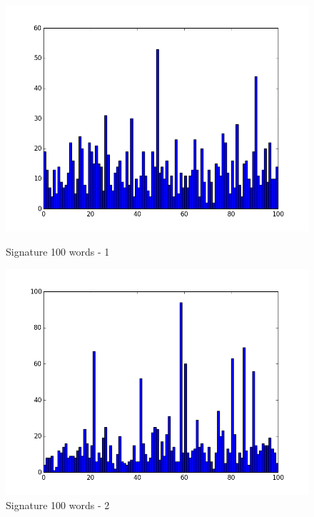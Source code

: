 \documentclass[xcolor=table]{beamer}
\begin{document}
\begin{frame}
\begin{figure}[htbp]
    \begin{minipage}[c]{.45\linewidth}
      \begin{center}
    \includegraphics[scale=0.20]{131_sig.png}
    \caption{Signature 100 words - 1}
    \label{fig:image4}
      \end{center}
    \end{minipage}
    \hfill
    \begin{minipage}[c]{.45\linewidth}
      \begin{center}
    \includegraphics[scale=0.20]{132_sig.png}
    \caption{Signature 100 words - 2}
    \label{fig:image5}
      \end{center}
    \end{minipage}
\end{figure}


\end{frame}
\end{document}

